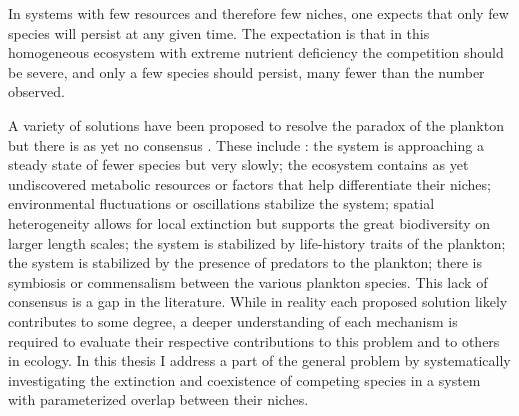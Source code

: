 In systems with few resources and therefore few niches, one expects that only few species will persist at any given time.
The expectation is that in this homogeneous ecosystem with extreme nutrient deficiency the competition should be severe, and only a few species should persist, many fewer than the number observed. 

A variety of solutions have been proposed to resolve the paradox of the plankton but there is as yet no consensus \cite{Roy2007}.
These include \cite{Hutchinson1961,May1999,Chesson2000,Roy2007}: the system is approaching a steady state of fewer species but very slowly; the ecosystem contains as yet undiscovered metabolic resources or factors that help differentiate their niches; environmental fluctuations or oscillations stabilize the system; spatial heterogeneity allows for local extinction but supports the great biodiversity on larger length scales; the system is stabilized by life-history traits of the plankton; the system is stabilized by the presence of predators to the plankton; there is symbiosis or commensalism between the various plankton species. 
This lack of consensus is a gap in the literature. 
While in reality each proposed solution likely contributes to some degree, a deeper understanding of each mechanism is required to evaluate their respective contributions to this problem and to others in ecology. 
In this thesis I address a part of the general problem by systematically investigating the extinction and coexistence of competing species in a system with parameterized overlap between their niches. %

